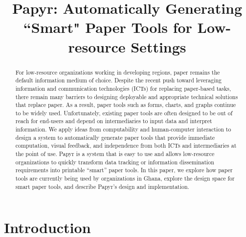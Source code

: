 \documentclass{sig-alternate}
\begin{document}
\newcommand{\nifty}{\textsf{Papyr}\xspace}

\title{Papyr: Automatically Generating ``Smart" Paper Tools for Low-resource Settings}
\author{}
\maketitle

\begin{abstract}
For low-resource organizations working in developing regions, paper remains the default information medium of choice. 
Despite the recent push toward leveraging information and communication technologies (ICTs) for replacing paper-based tasks, there remain many barriers to designing deployable and appropriate technical solutions that replace paper.
As a result, paper tools such as forms, charts, and graphs continue to be widely used.
Unfortunately, existing paper tools are often designed to be out of reach for end-users and depend on intermediaries to input data and interpret information. 
We apply ideas from computability and human-computer interaction to design a system to automatically generate paper tools that provide immediate computation, visual feedback, and independence from both ICTs and intermediaries at the point of use. 
\nifty is a system that is easy to use and allows low-resource organizations to quickly transform data tracking or information dissemination requirements into printable ``smart'' paper tools. 
In this paper, we explore how paper tools are currently being used by organizations in Ghana, explore the design space for smart paper tools, and describe \nifty's design and implementation.

\end{abstract}



\section{Introduction}
\end{document}
